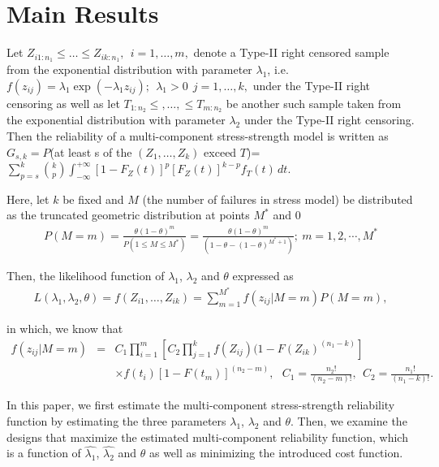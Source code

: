 \documentclass[twoside]{article}
\begin{document}
\section{\bf Main Results}\label{section2}
Let $Z_{i1:n_1}\leq \ldots \leq Z_{ik:n_1},\ \ i = 1,\ldots,m,$  denote a Type-II right  censored sample from the exponential distribution with parameter $\lambda_1$, i.e.  $f(z_{ij})=\lambda_1\exp(-\lambda_1 z_{ij});\    \   \lambda_1>0\ \ j=1,\ldots,k,$  under  the Type-II right censoring as well as let $T_{1:n_2}\leq,\ldots,\leq T_{m:n_2}$ be another such sample taken from the exponential distribution with parameter $\lambda_2$
under the Type-II right censoring.  Then the reliability of a multi-component stress-strength model is written as \\
$G_{s,k} = P$(at least s   of the  $(Z_1,\ldots , Z_k)$  exceed $T$)=
$\sum_{p=s}^{k} {k\choose p}\int_{-\infty}^{+\infty}\left[ 1-F_Z(t)\right]^p\left[F_Z(t)\right]^{k-p} f_T(t)\,d{t}$.


Here, let $k$  be fixed and $M$ (the number of failures in stress model) be  distributed as the truncated geometric distribution at points  $M^*$ and $0$ 
\begin{eqnarray}\label{M1}
P(M=m)=\frac{\theta (1-\theta)^m}{P(1\leq M\leq M^*)}=\frac{\theta (1-\theta)^m}{(1-\theta-(1-\theta)^{M^*+1})};\ m=1,2,\cdots, M^*
\end{eqnarray}

Then, the likelihood function of $\lambda_1$, $\lambda_2$ and $\theta$   expressed as
\begin{eqnarray}\label{M2}
L(\lambda_1,\lambda_2,\theta)=f(Z_{i1},\ldots, Z_{ik})=\sum_{m=1}^{M^*} f(z_{ij}|M=m)P(M=m),
\end{eqnarray}

in which, we know that
\begin{eqnarray}\label{M3}\nonumber
f(z_{ij}|M=m)&=&C_1\prod_{i=1}^{m}\left[C_2 \prod_{j=1}^{k} f(Z_{ij})(1-F(Z_{ik})^{(n_1-k)}\right ] \\ &&\times  f(t_i) \left[1-F(t_m)\right]^{(n_2-m)}, \ \  \ C_1=\frac{n_2!}{(n_2-m)!},\ \   C_2=\frac{n_1!}{(n_1-k)!}.
\end{eqnarray}


In this paper, we first estimate the multi-component stress-strength reliability function by estimating the three parameters $\lambda_1$, $\lambda_2$ and $\theta$. Then, we examine the designs that maximize the estimated multi-component reliability function, which is a function of $\hat{\lambda_1}$, $\hat{\lambda_2}$ and $\hat{\theta}$ as well as  minimizing the  introduced cost function.
\end{document}
